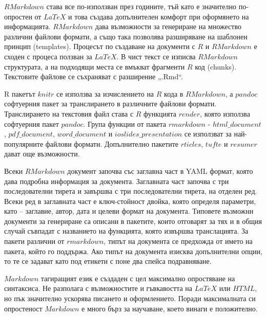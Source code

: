 $RMarkdown$ става все по-използван през годините, тъй като е значително по-опростен от $LaTeX$ и това създава допълнителен комфорт при оформянето на информацията. $RMarkdown$ дава възможности за генериране на множество различни файлови формати, а също така позволява разширяване на шаблонен принцип (templates). Процесът по създаване на документи с $R$ и $RMarkdown$ е сходен с процеса ползван за $LaTeX$. В чист текст се изписва $RMarkdown$ структурата, а на подходящи места се вмъкват фрагменти $R$ код (chunks). Текстовите файлове се съхраняват с разширение „.Rmd“.

R пакетът $knitr$ се използва за изчислението на $R$ кода в $RMarkdown$, а $pandoc$ софтуерния пакет за транслирането в различните файлови формати. Транслирането на текстовия файл става с $R$ функцията $render$, която използва софтуерния пакет $pandoc$. Група функции от пакета $rmarkdown$ - $html\_document$, $pdf\_document$, $word\_document$ и $ioslides\_presentation$ се използват за най-популярните файлови формати. Допълнително пакетите $rticles$, $tufte$ и $resumer$ дават още възможности.

Всеки $RMarkdown$ документ започва със заглавна част в YAML формат, която дава подробна информация за документа. Заглавната част започва с три последователни тирета и завършва с три последователни тирета, на отделен ред. Всеки ред в заглавната част е ключ-стойност двойка, която определя параметри, като – заглавие, автор, дата и целеви формат на документа. Типовете възможни документи за генериране са описани в пакетите, които отговарят за тях и в общия случай съвпадат с названието на функцията, която извършва транслацията. За пакети различни от $rmarkdown$, типът на документа се предхожда от името на пакета, който го поддържа. Ако типът на документа изисква допълнителни опции, то те се задават като под етикети с поне два спейса подравняване. 

$Markdown$ тагиращият език е създаден с цел максимално опростяване на синтаксиса. Не разполага с възможностите и гъвкавостта на $LaTeX$ или $HTML$, но пък значително ускорява писането и оформлението. Поради максималната си опростеност $Markdown$ е много бърз за научаване, което винаги е положително. 

